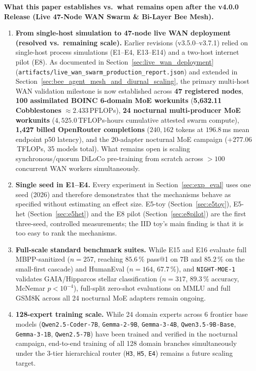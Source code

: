 \documentclass[11pt,a4paper]{article}
\begin{document}
\textbf{What this paper establishes vs.\ what remains open after the v4.0.0 Release (Live 47-Node WAN Swarm \& Bi-Layer Bee Mesh).}
\begin{enumerate}[leftmargin=1.8em]
    \item \textbf{From single-host simulation to 47-node live WAN deployment (resolved vs.\ remaining scale).} Earlier revisions (v3.5.0--v3.7.1) relied on single-host process simulations (E1--E4, E13--E14) and a two-host internet pilot (E8). As documented in Section~\ref{sec:live_wan_deployment} (\texttt{artifacts/live\_wan\_swarm\_production\_report.json}) and extended in Section~\ref{sec:bee_agent_mesh_and_diurnal_scaling}, the primary multi-host WAN validation milestone is now established across \textbf{47 registered nodes}, \textbf{100 assimilated BOINC 6-domain MoE workunits} (\textbf{5{,}632.11 Cobblestones} $\approx 2.433$\,PFLOPs), \textbf{24 nocturnal multi-producer MoE workunits} ($4{,}525.0$\,TFLOPs-hours cumulative attested swarm compute), \textbf{1{,}427 billed OpenRouter completions} ($240{,}162$ tokens at $196.8$\,ms mean endpoint p50 latency), and the 20-adapter nocturnal MoE campaign ($+277.06$\,TFLOPs, 35 models total). What remains open is scaling synchronous/quorum DiLoCo pre-training from scratch across $>100$ concurrent WAN workers simultaneously.
    \item \textbf{Single seed in E1--E4.} Every experiment in Section~\ref{sec:exp_eval} uses one seed (2026) and therefore demonstrates that the mechanisms behave as specified without estimating an effect size. E5-toy (Section~\ref{sec:e5toy}), E5-het (Section~\ref{sec:e5het}) and the E8 pilot (Section~\ref{sec:e8pilot}) are the first three-seed, controlled measurements; the IID toy's main finding is that it is too easy to rank the mechanisms.
    \item \textbf{Full-scale standard benchmark suites.} While E15 and E16 evaluate full MBPP-sanitized ($n=257$, reaching $85.6\,\%$ pass@1 on 7B and $85.2\,\%$ on the small-first cascade) and HumanEval ($n=164$, $67.7\,\%$), and \texttt{NIGHT-MOE-1} validates GAIA/Hipparcos stellar classification ($n=317$, $89.3\,\%$ accuracy, McNemar $p < 10^{-4}$), full-split zero-shot evaluations on MMLU and full GSM8K across all 24 nocturnal MoE adapters remain ongoing.
    \item \textbf{128-expert training scale.} While 24 domain experts across 6 frontier base models (\texttt{Qwen2.5-Coder-7B}, \texttt{Gemma-2-9B}, \texttt{Gemma-3-4B}, \texttt{Qwen3.5-9B-Base}, \texttt{Gemma-3-1B}, \texttt{Qwen2.5-7B}) have been trained and verified in the nocturnal campaign, end-to-end training of all 128 domain branches simultaneously under the 3-tier hierarchical router (\texttt{H3}, \texttt{H5}, \texttt{E4}) remains a future scaling target.

\end{enumerate}
\end{document}
